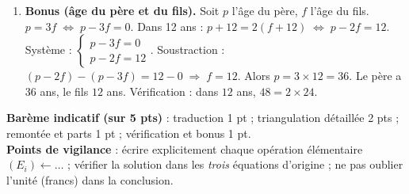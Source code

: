 \documentclass[11pt]{article}
\begin{document}
\begin{corrige}
\begin{enumerate}
\item \textbf{Bonus (âge du père et du fils).}
Soit $p$ l'âge du père, $f$ l'âge du fils.
$p = 3f \;\Leftrightarrow\; p - 3f = 0$.
Dans 12 ans : $p + 12 = 2(f + 12) \;\Leftrightarrow\; p - 2f = 12$.
Système : $\begin{cases} p - 3f = 0 \\ p - 2f = 12 \end{cases}$.
Soustraction : $(p-2f) - (p-3f) = 12 - 0 \;\Rightarrow\; f = 12$.
Alors $p = 3\times 12 = 36$.
Le père a $36$ ans, le fils $12$ ans. Vérification : dans $12$ ans, $48 = 2\times 24$.
\end{enumerate}
\textbf{Barème indicatif (sur 5 pts)} : traduction 1 pt ; triangulation détaillée 2 pts ; remontée et parts 1 pt ; vérification et bonus 1 pt.\\
\textbf{Points de vigilance} : écrire explicitement chaque opération élémentaire $(E_i) \leftarrow \dots$ ; vérifier la solution dans les \emph{trois} équations d'origine ; ne pas oublier l'unité (francs) dans la conclusion.
\end{corrige}
\end{document}
